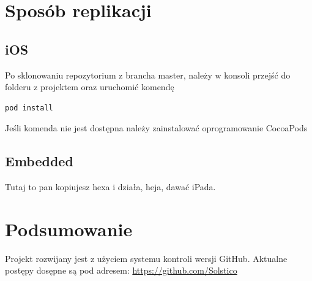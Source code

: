\documentclass[a4paper,11pt]{article}
\begin{document}
\section{Sposób replikacji}

\subsection{iOS}
Po sklonowaniu repozytorium z brancha master, należy w konsoli przejść do folderu z projektem oraz uruchomić komendę 
\begin{lstlisting}
pod install
\end{lstlisting}
Jeśli komenda nie jest dostępna należy zainstalować oprogramowanie CocoaPods

\subsection{Embedded}
Tutaj to pan kopiujesz hexa i działa, heja, dawać iPada.
	
\section{Podsumowanie}
	Projekt rozwijany jest z użyciem systemu kontroli wersji GitHub. Aktualne postępy dosępne są pod adresem: \url{https://github.com/Solstico}
	
	
	
	
	
	
\end{document}
